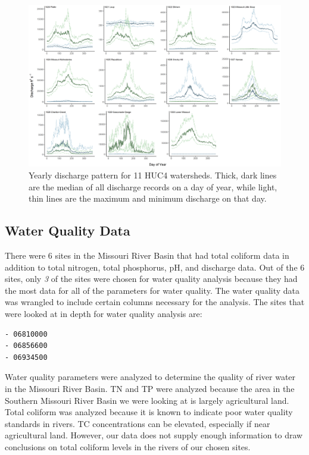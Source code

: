\documentclass[12pt,]{article}
\makeatletter
\def\maxwidth{\ifdim\Gin@nat@width>\linewidth\linewidth\else\Gin@nat@width\fi}
\makeatother
\begin{document}
\begin{figure}
\includegraphics[width=\maxwidth]{../Figures/discharge} \caption{\label{fig:dispattern}Yearly discharge pattern for 11 HUC4 watersheds. Thick, dark lines are the median of all discharge records on a day of year, while light, thin lines are the maximum and minimum discharge on that day.}\label{fig:dispattern}
\end{figure}

\hypertarget{water-quality-data}{%
\subsection{Water Quality Data}\label{water-quality-data}}

There were 6 sites in the Missouri River Basin that had total coliform
data in addition to total nitrogen, total phosphorus, pH, and discharge
data. Out of the 6 sites, only \emph{3} of the sites were chosen for
water quality analysis because they had the most data for all of the
parameters for water quality. The water quality data was wrangled to
include certain columns necessary for the analysis. The sites that were
looked at in depth for water quality analysis are:

\begin{verbatim}
- 06810000
- 06856600
- 06934500
\end{verbatim}

Water quality parameters were analyzed to determine the quality of river
water in the Missouri River Basin. TN and TP were analyzed because the
area in the Southern Missouri River Basin we were looking at is largely
agricultural land. Total coliform was analyzed because it is known to
indicate poor water quality standards in rivers. TC concentrations can
be elevated, especially if near agricultural land. However, our data
does not supply enough information to draw conclusions on total coliform
levels in the rivers of our chosen sites.
\end{document}
